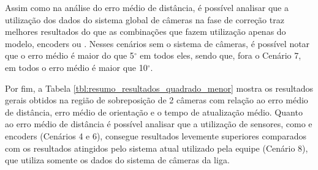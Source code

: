 \documentclass[acronym, symbols, table, deposito]{fei}
\begin{document}
	Assim como na análise do erro médio de distância, é possível analisar que a utilização dos dados do sistema global de câmeras na fase de correção traz melhores resultados do que as combinações que fazem utilização apenas do modelo, encoders ou . Nesses cenários sem o sistema de câmeras, é possível notar que o erro médio é maior do que 5$^\circ$ em todos eles, sendo que, fora o Cenário 7, em todos o erro médio é maior que 10$^\circ$.

	Por fim, a Tabela \ref{tbl:resumo_resultados_quadrado_menor} mostra os resultados gerais obtidos na região de sobreposição de 2 câmeras com relação ao erro médio de distância, erro médio de orientação e o tempo de atualização médio. Quanto ao erro médio de distância é possível analisar que a utilização de sensores, como  e encoders (Cenários 4 e 6), consegue resultados levemente superiores comparados com os resultados atingidos pelo sistema atual utilizado pela equipe (Cenário 8), que utiliza somente os dados do sistema de câmeras da liga.
\end{document}
